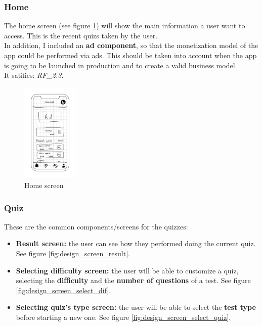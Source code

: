 \subsubsection{Home}
The home screen (see figure \ref{fig:design_home}) will show the main information a user want to access. This is the recent quizs taken by the user. \\

In addition, I included an \textbf{ad component}, so that the monetization model of the app could be performed via ads. This should be taken into account when the app is going to be launched in production and to create a valid business model.\\

It satifies: \textit{RF\_2.3}. \\
\begin{figure}[H]
    \centering
        \includegraphics[width=0.24\textwidth]{assets/screens/Home.png}
    \caption{Home screen}
    \label{fig:design_home}
\end{figure}

\subsubsection{Quiz}
These are the common components/screens for the quizzes: \\

\begin{itemize}[noitemsep]
    \item \textbf{Result screen:} the user can see how they performed doing the current quiz. See figure \ref{fig:design_screen_result}.
    \item \textbf{Selecting difficulty screen:} the user will be able to customize a quiz, selecting the \textbf{difficulty} and the \textbf{number of questions} of a test. See figure \ref{fig:design_screen_select_dif}.
    \item \textbf{Selecting quiz's type screen:} the user will be able to select the \textbf{test type} before starting a new one. See figure \ref{fig:design_screen_select_quiz}.
\end{itemize}

